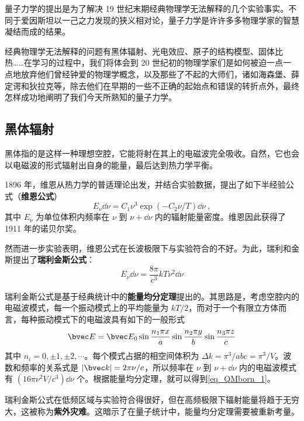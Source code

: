 
量子力学的提出是为了解决 19 世纪末期经典物理学无法解释的几个实验事实。不同于爱因斯坦以一己之力发现的狭义相对论，量子力学是许许多多物理学家的智慧凝结而成的结果。

经典物理学无法解释的问题有黑体辐射、光电效应、原子的结构模型、固体比热……在学习的过程中，我们将体会到 20 世纪初的物理学家们是如何被迫一点一点地放弃他们曾经钟爱的物理学概念，以及那些了不起的大师们，诸如海森堡、薛定谔和狄拉克等，除去他们在早期的一些不正确的起始点和错误的转折点外，最终怎样成功地阐明了我们今天所熟知的量子力学。

\subsection{黑体辐射}
黑体指的是这样一种理想空腔，它能将射在其上的电磁波完全吸收。自然，它也会以电磁波的形式辐射出自身的能量，最后达到热力学平衡。

1896 年，维恩从热力学的普适理论出发，并结合实验数据，提出了如下半经验公式（\textbf{维恩公式}）
\begin{equation}
E_\nu \dd \nu=C_1\nu^3 \exp(-C_2 \nu /T) \dd \nu~,
\end{equation}
其中 $E_\nu$ 为单位体积内频率在 $\nu$ 到 $\nu+\dd \nu$ 内的辐射能量密度。维恩因此获得了 1911 年的诺贝尔奖。

然而进一步实验表明，维恩公式在长波极限下与实验符合的不好。为此，瑞利和金斯提出了\textbf{瑞利金斯公式}：
\begin{equation}\label{eq_QMborn_1}
E_\nu \dd \nu=\frac{8\pi}{c^3}kT\nu^2 \dd \nu
\end{equation}

瑞利金斯公式是基于经典统计中的\textbf{能量均分定理}提出的。其思路是，考虑空腔内的电磁波模式，每一个振动模式上的平均能量为 $kT/2$，而对于一个有限立方体而言，每种振动模式下的电磁波具有如下的一般形式
\begin{equation}
\bvec E=\bvec E_0 \sin\frac{n_1\pi x}{a} \sin\frac{n_2\pi y}{b}\sin \frac{n_3\pi z}{c}
\end{equation}
其中 $n_i=0,\pm 1,\pm 2,\cdots$。每个模式占据的相空间体积为 $\Delta k=\pi^3/abc=\pi^3/V$。波数和频率的关系式是 $|\bvec k| = 2\pi\nu/c$，所以频率在 $\nu$ 到 $\nu+\dd \nu$ 内的电磁波模式有 $(16\pi \nu^2V/c^3 )\dd \nu$ 个。根据能量均分定理，就可以得到\autoref{eq_QMborn_1}。

瑞利金斯公式在低频区域与实验符合得很好，但在高频极限下辐射能量将趋于无穷大，这被称为\textbf{紫外灾难}。这暗示了在量子统计中，能量均分定理需要被重新考量。

